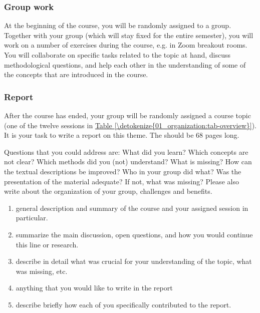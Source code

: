 \documentclass[letterpaper,10pt,english]{sphinxmanual}
\begin{document}
\subsubsection*{Group work}

At the beginning of the course, you will be randomly assigned to a group.
Together with your group (which will stay fixed for the entire semester),
you will work on a number of exercises during the course, e.g. in Zoom breakout rooms.
You will collaborate on specific tasks related to the topic at hand, discuss methodological questions,
and help each other in the understanding of some of the concepts that are introduced in the course.
\subsubsection*{Report}

After the course has ended, your group will be randomly assigned a course topic (one of the twelve sessions in \hyperref[\detokenize{01_organization:tab-overview}]{Table \ref{\detokenize{01_organization:tab-overview}}}).
It is your task to write a report on this theme. The should be 6\textendash{}8 pages long.

Questions that you could address are:
What did you learn? Which concepts are not clear? Which methods did you (not) understand?
What is missing? How can the textual descriptions be improved? Who in your group did what?
Was the presentation of the material adequate? If not, what was missing?
Please also write about the organization of your group, challenges and benefits.

\begin{enumerate}
%
\item {} 
 general description and summary of the course and your assigned session in particular.

\item {} 
 summarize the main discussion, open questions, and how you would continue this line or research.

\item {} 
 describe in detail what was crucial for your understanding of the topic, what was missing, etc.

\item {} 
 anything that you would like to write in the report

\item {} 
 describe briefly how each of you specifically contributed to the report.

\end{enumerate}
\end{document}
